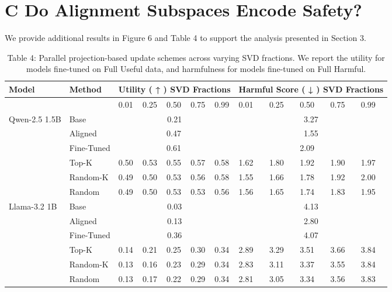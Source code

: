 \documentclass[10pt]{article}
\begin{document}
\section*{C Do Alignment Subspaces Encode Safety?}
We provide additional results in Figure 6 and Table 4 to support the analysis presented in Section 3.

\begin{table}[h]
\begin{center}
\captionsetup{labelformat=empty}
\caption{Table 4: Parallel projection-based update schemes across varying SVD fractions. We report the utility for models fine-tuned on Full Useful data, and harmfulness for models fine-tuned on Full Harmful.}
\begin{tabular}{|l|l|l|l|l|l|l|l|l|l|l|l|}
\hline
\multirow{2}{*}{Model} & \multirow{2}{*}{Method} & \multicolumn{5}{|c|}{Utility ( ↑ ) SVD Fractions} & \multicolumn{5}{|c|}{Harmful Score ( ↓ ) SVD Fractions} \\
\hline
 &  & 0.01 & 0.25 & 0.50 & 0.75 & 0.99 & 0.01 & 0.25 & 0.50 & 0.75 & 0.99 \\
\hline
\multirow{6}{*}{Qwen-2.5 1.5B} & Base & \multicolumn{5}{|c|}{0.21} & \multicolumn{5}{|c|}{3.27} \\
\hline
 & Aligned &  &  & 0.47 &  &  & \multicolumn{5}{|c|}{1.55} \\
\hline
 & Fine-Tuned &  &  & 0.61 &  &  &  &  & 2.09 &  &  \\
\hline
 & Top-K & 0.50 & 0.53 & 0.55 & 0.57 & 0.58 & 1.62 & 1.80 & 1.92 & 1.90 & 1.97 \\
\hline
 & Random-K & 0.49 & 0.50 & 0.53 & 0.56 & 0.58 & 1.55 & 1.66 & 1.78 & 1.92 & 2.00 \\
\hline
 & Random & 0.49 & 0.50 & 0.53 & 0.53 & 0.56 & 1.56 & 1.65 & 1.74 & 1.83 & 1.95 \\
\hline
\multirow{6}{*}{Llama-3.2 1B} & Base & \multicolumn{5}{|c|}{0.03} & \multicolumn{5}{|c|}{4.13} \\
\hline
 & Aligned & \multicolumn{5}{|c|}{0.13} & \multicolumn{5}{|c|}{2.80} \\
\hline
 & Fine-Tuned & \multicolumn{5}{|c|}{0.36} & \multicolumn{5}{|c|}{4.07} \\
\hline
 & Top-K & 0.14 & 0.21 & 0.25 & 0.30 & 0.34 & 2.89 & 3.29 & 3.51 & 3.66 & 3.84 \\
\hline
 & Random-K & 0.13 & 0.16 & 0.23 & 0.29 & 0.34 & 2.83 & 3.11 & 3.37 & 3.55 & 3.84 \\
\hline
 & Random & 0.13 & 0.17 & 0.22 & 0.29 & 0.34 & 2.81 & 3.05 & 3.34 & 3.56 & 3.83 \\

\end{tabular}
\end{center}
\end{table}
\end{document}

